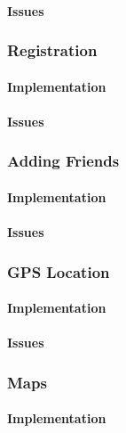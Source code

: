 \paragraph*{Issues}


\subsubsection*{Registration}

\paragraph*{Implementation}

\paragraph*{Issues}


\subsubsection*{Adding Friends}

\paragraph*{Implementation}

\paragraph*{Issues}


\subsubsection*{GPS Location}

\paragraph*{Implementation}

\paragraph*{Issues}


\subsubsection*{Maps}

\paragraph*{Implementation}

